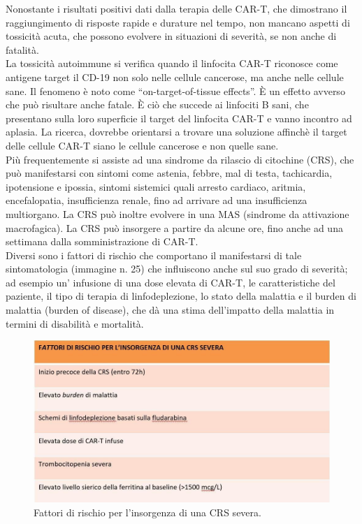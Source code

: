 Nonostante i risultati positivi dati dalla terapia delle CAR-T, che dimostrano il raggiungimento di risposte rapide e 
durature nel tempo, non mancano aspetti di tossicità acuta, che possono evolvere in situazioni di severità, se non 
anche di fatalità\cite{EMATOCART}.\\
La tossicità autoimmune si verifica quando il linfocita CAR-T riconosce come antigene target il CD-19 non solo nelle 
cellule cancerose, ma anche nelle cellule sane.
Il fenomeno è noto come “on-target-of-tissue effects”. È un effetto avverso che può risultare anche fatale.
È ciò che succede ai linfociti B sani, che presentano sulla loro superficie il target del linfocita CAR-T e vanno 
incontro ad aplasia. La ricerca, dovrebbe orientarsi a trovare una soluzione affinchè il target delle cellule CAR-T 
siano le cellule cancerose e non quelle sane\cite{Frontiers}.\\

Più frequentemente si assiste ad una sindrome da rilascio di citochine (CRS), che può manifestarsi con sintomi come 
astenia, febbre, mal di testa, tachicardia, ipotensione e ipossia, sintomi sistemici quali arresto cardiaco, aritmia, 
encefalopatia, insufficienza renale, fino ad arrivare ad una insufficienza multiorgano. La CRS può inoltre evolvere 
in una MAS (sindrome da attivazione macrofagica). 
La CRS può insorgere a partire da alcune ore, fino anche ad una settimana dalla somministrazione di CAR-T.\\
Diversi sono i fattori di rischio che comportano il manifestarsi di tale sintomatologia (immagine n. 25) che 
influiscono anche sul suo grado di severità; ad esempio un’ infusione di una dose elevata di CAR-T, le caratteristiche 
del paziente, il tipo di terapia di linfodeplezione, lo stato della malattia e il  burden di malattia 
(burden of disease), che dà una stima dell’impatto della malattia in termini di disabilità e mortalità\cite{EMATOCART}.\\

\begin{figure}[H]
    \begin{center}
    \includegraphics[width=0.8\columnwidth]{img/rischioCRS.jpeg}
    \end{center}
    \caption[Fattori di rischio per l’insorgenza di una CRS severa. ]{Fattori di rischio per l’insorgenza di una CRS severa. 
    \cite{img25}}

\end{figure}

